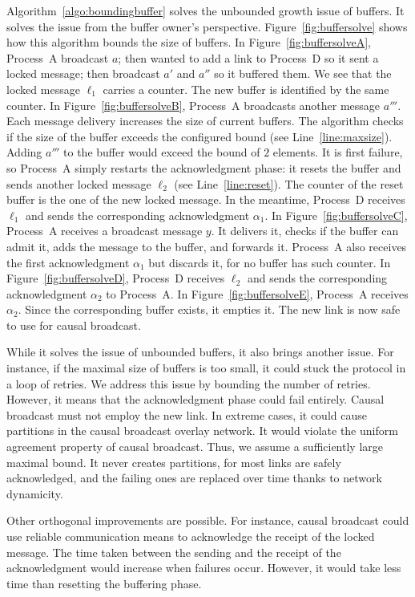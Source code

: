 Algorithm~\ref{algo:boundingbuffer} solves the unbounded growth issue of
buffers. It solves the issue from the buffer owner's
perspective. Figure~\ref{fig:buffersolve} shows how this algorithm bounds the
size of buffers. In Figure~\ref{fig:buffersolveA}, Process~A broadcast $a$; then
wanted to add a link to Process~D so it sent a locked message; then broadcast
$a'$ and $a''$ so it buffered them. We see that the locked message $\ell_1$
carries a counter. The new buffer is identified by the same counter. In
Figure~\ref{fig:buffersolveB}, Process~A broadcasts another message $a'''$. Each
message delivery increases the size of current buffers. The algorithm checks if
the size of the buffer exceeds the configured bound (see
Line~\ref{line:maxsize}). Adding $a'''$ to the buffer would exceed the bound of
$2$ elements. It is first failure, so Process~A simply restarts the
acknowledgment phase: it resets the buffer and sends another locked message
$\ell_2$ (see Line~\ref{line:reset}). The counter of the reset buffer is the one
of the new locked message. In the meantime, Process~D receives $\ell_1$ and
sends the corresponding acknowledgment $\alpha_1$. In
Figure~\ref{fig:buffersolveC}, Process~A receives a broadcast message $y$. It
delivers it, checks if the buffer can admit it, adds the message to the buffer,
and forwards it. Process~A also receives the first acknowledgment $\alpha_1$ but
discards it, for no buffer has such counter. In Figure~\ref{fig:buffersolveD},
Process~D receives $\ell_2$ and sends the corresponding acknowledgment
$\alpha_2$ to Process~A. In Figure~\ref{fig:buffersolveE}, Process~A receives
$\alpha_2$. Since the corresponding buffer exists, it empties it. The new link
is now safe to use for causal broadcast.

While it solves the issue of unbounded buffers, it also brings another
issue. For instance, if the maximal size of buffers is too small, it could stuck
the protocol in a loop of retries. We address this issue by bounding the number
of retries. However, it means that the acknowledgment phase could fail
entirely. Causal broadcast must not employ the new link. In extreme cases, it
could cause partitions in the causal broadcast overlay network. It would violate
the uniform agreement property of causal broadcast. Thus, we assume a
sufficiently large maximal bound. It never creates partitions, for most links
are safely acknowledged, and the failing ones are replaced over time thanks to
network dynamicity.

Other orthogonal improvements are possible. For instance, causal broadcast could
use reliable communication means to acknowledge the receipt of the locked
message. The time taken between the sending and the receipt of the
acknowledgment would increase when failures occur. However, it would take less
time than resetting the buffering phase.

